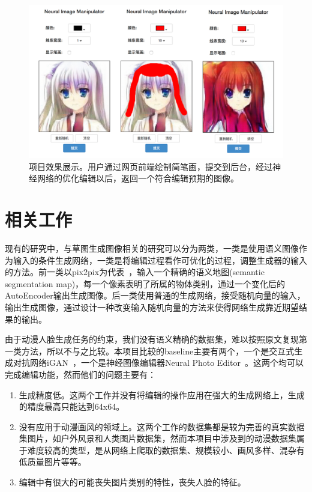 \documentclass[a4paper,12pt,UTF8]{ctexart}
\newcommand{\kai}{\CJKfamily{zhkai}}	%
\begin{document}
\begin{figure}[H]
  \centering
  \includegraphics[width=0.9\linewidth]{figs/frontend.png}
  \caption{\kai 项目效果展示。用户通过网页前端绘制简笔画，提交到后台，经过神经网络的优化编辑以后，返回一个符合编辑预期的图像。}
  \label{fig:frontend}
\end{figure}


\section{相关工作}


现有的研究中，与草图生成图像相关的研究可以分为两类，一类是使用语义图像作为输入的条件生成网络，一类是将编辑过程看作可优化的过程，调整生成器的输入的方法。前一类以pix2pix为代表~\cite{isola2016image}，输入一个精确的语义地图(semantic segmentation map)，每一个像素表明了所属的物体类别，通过一个变化后的AutoEncoder输出生成图像。后一类使用普通的生成网络，接受随机向量的输入，输出生成图像，通过设计一种改变输入随机向量的方法来使得网络生成靠近期望结果的输出。

由于动漫人脸生成任务的约束，我们没有语义精确的数据集，难以按照原文复现第一类方法，所以不与之比较。本项目比较的baseline主要有两个，一个是交互式生成对抗网络iGAN~\cite{Zhu2016Generative}，一个是神经图像编辑器Neural Photo Editor~\cite{Brock2016Neural}。这两个均可以完成编辑功能，然而他们的问题主要有：

\begin{enumerate}
\item 生成精度低。这两个工作并没有将编辑的操作应用在强大的生成网络上，生成的精度最高只能达到64x64。
\item 没有应用于动漫画风的领域上。这两个工作的数据集都是较为完善的真实数据集图片，如户外风景和人类图片数据集，然而本项目中涉及到的动漫数据集属于难度较高的类型，是从网络上爬取的数据集、规模较小、画风多样、混杂有低质量图片等等。
\item 编辑中有很大的可能丧失图片类别的特性，丧失人脸的特征。
\end{enumerate}
\end{document}
